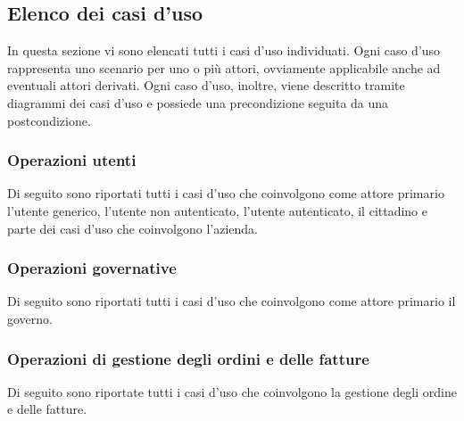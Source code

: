 \subsection{Elenco dei casi d'uso}
In questa sezione vi sono elencati tutti i casi d'uso individuati. Ogni caso d'uso rappresenta uno scenario per uno o più attori, ovviamente applicabile anche ad eventuali attori derivati. Ogni caso d'uso, inoltre, viene descritto tramite diagrammi dei casi d'uso e possiede una precondizione seguita da una postcondizione.
\subsubsection*{Operazioni utenti}
Di seguito sono riportati tutti i casi d'uso che coinvolgono come attore primario l'utente generico, l'utente non autenticato, l'utente autenticato, il cittadino e parte dei casi d'uso che coinvolgono l'azienda.







\pagebreak
\subsubsection*{Operazioni governative}
Di seguito sono riportati tutti i casi d'uso che coinvolgono come attore primario il governo.




\subsubsection*{Operazioni di gestione degli ordini e delle fatture}
Di seguito sono riportate tutti i casi d'uso che coinvolgono la gestione degli ordine e delle fatture.


